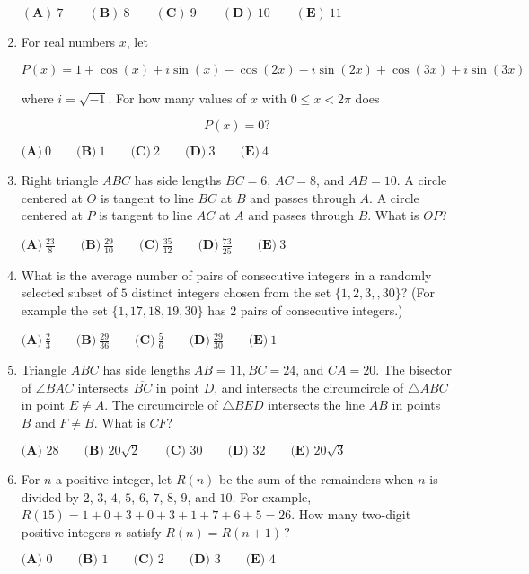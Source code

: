 \documentclass{article}
\begin{document}
\begin{enumerate}[label=\arabic*., itemsep=0.5em]
$(\textbf{A})\: 7\qquad(\textbf{B}) \: 8\qquad(\textbf{C}) \: 9\qquad(\textbf{D}) \: 10\qquad(\textbf{E}) \: 11$\par \vspace{0.5em}\item For real numbers $x$, let 

\begin{equation*}
P(x)=1+\cos(x)+i\sin(x)-\cos(2x)-i\sin(2x)+\cos(3x)+i\sin(3x)
\end{equation*}

where $i = \sqrt{-1}$. For how many values of $x$ with $0\leq x<2\pi$ does 

\begin{equation*}
P(x)=0?
\end{equation*}


$\textbf{(A)}\ 0 \qquad\textbf{(B)}\  1 \qquad\textbf{(C)}\  2 \qquad\textbf{(D)}\
3 \qquad\textbf{(E)}\ 4$\par \vspace{0.5em}\item Right triangle $ABC$ has side lengths $BC=6$, $AC=8$, and $AB=10$. A circle centered at $O$ is tangent to line $BC$ at $B$ and passes through $A$. A circle centered at $P$ is tangent to line $AC$ at $A$ and passes through $B$. What is $OP$?

$\textbf{(A)}\ \frac{23}{8} \qquad\textbf{(B)}\  \frac{29}{10} \qquad\textbf{(C)}\  \frac{35}{12} \qquad\textbf{(D)}\
\frac{73}{25} \qquad\textbf{(E)}\ 3$\par \vspace{0.5em}\item What is the average number of pairs of consecutive integers in a randomly selected subset of $5$ distinct integers chosen from the set $\{ 1, 2, 3, , 30\}$? (For example the set $\{1, 17, 18, 19, 30\}$ has $2$ pairs of consecutive integers.)

$\textbf{(A)}\ \frac{2}{3} \qquad\textbf{(B)}\ \frac{29}{36} \qquad\textbf{(C)}\ \frac{5}{6} \qquad\textbf{(D)}\
\frac{29}{30} \qquad\textbf{(E)}\ 1$\par \vspace{0.5em}\item Triangle $ABC$ has side lengths $AB = 11, BC=24$, and $CA = 20$. The bisector of $\angle{BAC}$ intersects $\overline{BC}$ in point $D$, and intersects the circumcircle of $\triangle{ABC}$ in point $E \ne A$. The circumcircle of $\triangle{BED}$ intersects the line $AB$ in points $B$ and $F \ne B$. What is $CF$?

$\textbf{(A) } 28 \qquad \textbf{(B) } 20\sqrt{2} \qquad \textbf{(C) } 30 \qquad \textbf{(D) } 32 \qquad \textbf{(E) } 20\sqrt{3}$\par \vspace{0.5em}\item For $n$ a positive integer, let $R(n)$ be the sum of the remainders when $n$ is divided by $2$, $3$, $4$, $5$, $6$, $7$, $8$, $9$, and $10$. For example, $R(15) = 1+0+3+0+3+1+7+6+5=26$. How many two-digit positive integers $n$ satisfy $R(n) = R(n+1)\,?$

$\textbf{(A) }0\qquad\textbf{(B) }1\qquad\textbf{(C) }2\qquad\textbf{(D) }3\qquad\textbf{(E) }4$\par \vspace{0.5em}\end{enumerate}\newpage
\end{document}
